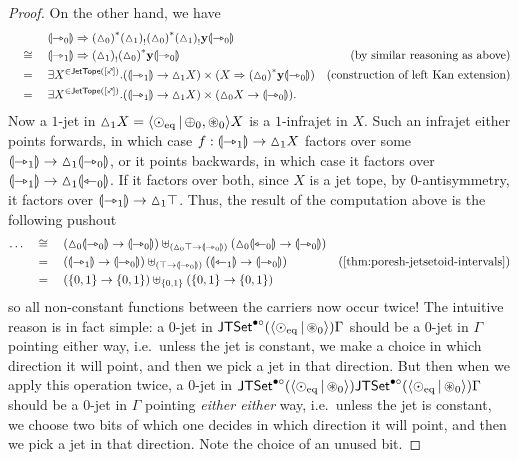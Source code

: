 \documentclass[a4paper]{memoir}
\begin{document}
\begin{proof}
	On the other hand, we have
	\begin{align*}
		&\quad\mathrel{\phantom{=}}\quad
		\DSub{\rival{\jetsym_0}}{\fpsh{(\cohdisc_0)} \lpsh{(\cohdisc_1)} \fpsh{(\cohdisc_0)} \lpsh{(\cohdisc_1)} \yoneda \rival{\jetsym_0}} \\
		&\quad\cong\quad \DSub{\rival{\jetsym_1}}{\lpsh{(\cohdisc_1)} \fpsh{(\cohdisc_0)} \yoneda \rival{\jetsym_0}}
		& \text{(by similar reasoning as above)} \\
		&\quad=\quad
		\exists X^{{}\in \jettope{[\ypolar]}}.(\rival{\jetsym_1} \to \cohdisc_1 X) \times (\DSub{X}{\fpsh{(\cohdisc_0)} \yoneda \rival{\jetsym_0}})
		& \text{(construction of left Kan extension)} \\
		&\quad=\quad
		\exists X^{{}\in \jettope{[\ypolar]}}.(\rival{\jetsym_1} \to \cohdisc_1 X) \times (\cohdisc_0 X \to \rival{\jetsym_0}).
	\end{align*}
	Now a $1$-jet in ${\vartriangle}_1 X = \mathopen{}\left\langle {\odot}_{\mathrm{eq}} \,\middle|\, {\oplus}_0, {\oast}_0 \right\rangle\mathclose{} X$ is a $1$-infrajet in $X$. Such an infrajet either points forwards, in which case $f : {\llparenthesis {\rightarrowtriangle}_1 \rrparenthesis} \to {\vartriangle}_1 X$ factors over some ${\llparenthesis {\rightarrowtriangle}_1 \rrparenthesis} \to {\vartriangle}_1 {\llparenthesis {\rightarrowtriangle}_0 \rrparenthesis}$, or it points backwards, in which case it factors over ${\llparenthesis {\rightarrowtriangle}_1 \rrparenthesis} \to {\vartriangle}_1 {\llparenthesis {\leftarrowtriangle}_0 \rrparenthesis}$.
	If it factors over both, since $X$ is a jet tope, by $0$-antisymmetry, it factors over ${\llparenthesis {\rightarrowtriangle}_1 \rrparenthesis} \to {\vartriangle}_1 \top$.
	Thus, the result of the computation above is the following pushout
	\begin{align*}
		\ldots &\quad\cong\quad
		(\cohdisc_0 \rival{\jetsym_0} \to \rival{\jetsym_0}) \uplus_{(\cohdisc_0 \top \to \rival{\jetsym_0})} (\cohdisc_0 \rival{\tejsym_0} \to \rival{\jetsym_0}) \\
		&\quad=\quad (\rival{\jetsym_1} \to \rival{\jetsym_0}) \uplus_{(\top \to \rival{\jetsym_0})} (\rival{\tejsym_1} \to \rival{\jetsym_0})
		& \text{(\cref{thm:poresh-jetsetoid-intervals})} \\
		&\quad=\quad (\accol{0,1} \to \accol{0, 1}) \uplus_{\accol{0, 1}} (\accol{0,1} \to \accol{0, 1})
	\end{align*}
	so all non-constant functions between the carriers now occur twice!
	The intuitive reason is in fact simple: a $0$-jet in $\mathsf{JTSet}^{\bullet \circ}(\mathopen{}\left\langle {\odot}_{\mathrm{eq}} \,\middle|\, {\oast}_0 \right\rangle\mathclose{}) \Gamma$ should be a $0$-jet in $\Gamma$ pointing either way, i.e.\ unless the jet is constant, we make a choice in which direction it will point, and then we pick a jet in that direction.
	But then when we apply this operation twice, a $0$-jet in $\mathsf{JTSet}^{\bullet \circ}(\mathopen{}\left\langle {\odot}_{\mathrm{eq}} \,\middle|\, {\oast}_0 \right\rangle\mathclose{}) \mathsf{JTSet}^{\bullet \circ}(\mathopen{}\left\langle {\odot}_{\mathrm{eq}} \,\middle|\, {\oast}_0 \right\rangle\mathclose{}) \Gamma$  should be a $0$-jet in $\Gamma$ pointing \emph{either either} way, i.e.\ unless the jet is constant, we choose two bits of which one decides in which direction it will point, and then we pick a jet in that direction.
	Note the choice of an unused bit.
	

\end{proof}
\end{document}
